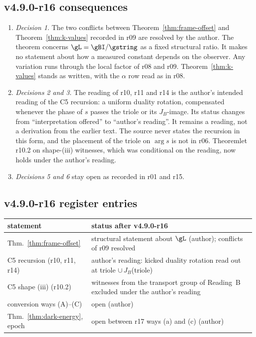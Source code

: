 \subsection*{v4.9.0-r16 consequences}
\label{subsec:v490-r16-consequences}

\begin{enumerate}[leftmargin=2em]
\item \emph{Decision 1.}  The two conflicts between Theorem~\ref{thm:frame-offset} and Theorem~\ref{thm:k-values} recorded in
r09 are resolved by the author.  The theorem concerns \(\gL=\gBI/\gstring\) as a fixed structural ratio.  It makes no
statement about how a measured constant depends on the observer.  Any variation runs through the local factor of r08 and
r09.  Theorem~\ref{thm:k-values} stands as written, with the \(\alpha\) row read as in r08.
\item \emph{Decisions 2 and 3.}  The reading of r10, r11 and r14 is the author's intended reading of the C5 recursion: a
uniform duality rotation, compensated whenever the phase of \(s\) passes the triole or its \(J_B\)-image.  Its status changes
from ``interpretation offered'' to ``author's reading''.  It remains a reading, not a derivation from the earlier text.
The source never states the recursion in this form, and the placement of the triole on \(\arg s\) is not in r06.
Theoremlet r10.2 on shape-(iii) witnesses, which was conditional on the reading, now holds under the author's reading.
\item \emph{Decisions 5 and 6} stay open as recorded in r01 and r15.
\end{enumerate}

\subsection*{v4.9.0-r16 register entries}
\label{subsec:v490-r16-register}

\begin{center}
\small
\begin{tabular}{@{}>{\raggedright\arraybackslash}p{}>{\raggedright\arraybackslash}p{}@{}}
\toprule
statement & status after v4.9.0-r16\\
\midrule
Thm.~\ref{thm:frame-offset} & structural statement about \(\gL\) (author); conflicts of r09 resolved\\
C5 recursion (r10, r11, r14) & author's reading: kicked duality rotation read out at triole \(\cup\,J_B\)(triole)\\
C5 shape (iii) (r10.2) & witnesses from the transport group of Reading~B excluded under the author's reading\\
conversion ways (A)--(C) & open (author)\\
Thm.~\ref{thm:dark-energy}, epoch & open between r17 ways (a) and (c) (author)\\
\bottomrule
\end{tabular}
\end{center}

